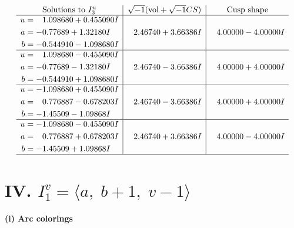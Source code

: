\documentclass[1p]{elsarticle_modified}
\theoremstyle{definition}
\newcommand{\I}{\sqrt{-1}}
\begin{document}
$$\begin{array}{c|c|c}  
\text{Solutions to }I^u_{3}& \I (\text{vol} + \sqrt{-1}CS) & \text{Cusp shape}\\
 \hline 
\begin{aligned}
u &= \phantom{-}1.098680 + 0.455090 I \\
a &= -0.77689 + 1.32180 I \\
b &= -0.544910 - 1.098680 I\end{aligned}
 & \phantom{-}2.46740 + 3.66386 I & \phantom{-}4.00000 - 4.00000 I \\ \hline\begin{aligned}
u &= \phantom{-}1.098680 - 0.455090 I \\
a &= -0.77689 - 1.32180 I \\
b &= -0.544910 + 1.098680 I\end{aligned}
 & \phantom{-}2.46740 - 3.66386 I & \phantom{-}4.00000 + 4.00000 I \\ \hline\begin{aligned}
u &= -1.098680 + 0.455090 I \\
a &= \phantom{-}0.776887 - 0.678203 I \\
b &= -1.45509 - 1.09868 I\end{aligned}
 & \phantom{-}2.46740 - 3.66386 I & \phantom{-}4.00000 + 4.00000 I \\ \hline\begin{aligned}
u &= -1.098680 - 0.455090 I \\
a &= \phantom{-}0.776887 + 0.678203 I \\
b &= -1.45509 + 1.09868 I\end{aligned}
 & \phantom{-}2.46740 + 3.66386 I & \phantom{-}4.00000 - 4.00000 I\\
 \hline 
 \end{array}$$\newpage\newpage\renewcommand{\arraystretch}{1}
\centering \section*{IV. $I^v_{1}= \langle a,\;b+1,\;v-1 \rangle$}
\flushleft \textbf{(i) Arc colorings}\\
\end{document}
